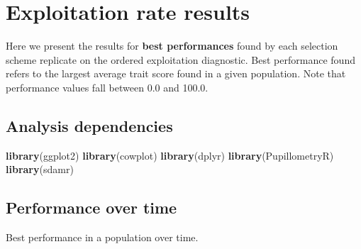 \documentclass[]{book}
\newenvironment{Shaded}{\begin{snugshade}}{\end{snugshade}}
\newcommand{\CharTok}[1]{\textcolor[rgb]{0.31,0.60,0.02}{#1}}
\newcommand{\CommentTok}[1]{\textcolor[rgb]{0.56,0.35,0.01}{\textit{#1}}}
\newcommand{\DataTypeTok}[1]{\textcolor[rgb]{0.13,0.29,0.53}{#1}}
\newcommand{\KeywordTok}[1]{\textcolor[rgb]{0.13,0.29,0.53}{\textbf{#1}}}
\newcommand{\NormalTok}[1]{#1}
\newcommand{\OperatorTok}[1]{\textcolor[rgb]{0.81,0.36,0.00}{\textbf{#1}}}
\newcommand{\StringTok}[1]{\textcolor[rgb]{0.31,0.60,0.02}{#1}}
\begin{document}
\hypertarget{exploitation-rate-results-1}{%
\chapter{Exploitation rate results}\label{exploitation-rate-results-1}}

Here we present the results for \textbf{best performances} found by each selection scheme replicate on the ordered exploitation diagnostic.
Best performance found refers to the largest average trait score found in a given population.
Note that performance values fall between 0.0 and 100.0.

\hypertarget{analysis-dependencies-1}{%
\section{Analysis dependencies}\label{analysis-dependencies-1}}

\begin{Shaded}
\begin{Highlighting}[]
\KeywordTok{library}\NormalTok{(ggplot2)}
\KeywordTok{library}\NormalTok{(cowplot)}
\KeywordTok{library}\NormalTok{(dplyr)}
\KeywordTok{library}\NormalTok{(PupillometryR)}
\KeywordTok{library}\NormalTok{(sdamr)}
\end{Highlighting}
\end{Shaded}

\hypertarget{performance-over-time-2}{%
\section{Performance over time}\label{performance-over-time-2}}

Best performance in a population over time.

\begin{Shaded}
\end{Shaded}
\end{document}
